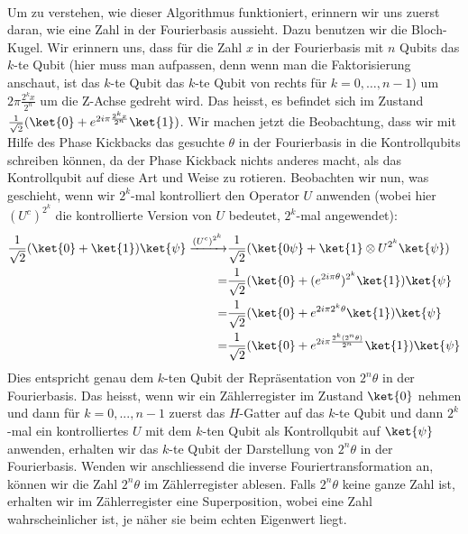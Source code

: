 \paragraph{}
\noindent Um zu verstehen, wie dieser Algorithmus funktioniert, erinnern wir uns zuerst daran, wie eine Zahl in der Fourierbasis aussieht. Dazu benutzen wir die Bloch-Kugel. Wir erinnern uns, dass für die Zahl $x$ in der Fourierbasis mit $n$ Qubits das $k$-te Qubit (hier muss man aufpassen, denn wenn man die Faktorisierung anschaut, ist das $k$-te Qubit das $k$-te Qubit von rechts für $k = 0, \dots, n - 1$) um $2\pi\frac{2^kx}{2^n}$ um die Z-Achse gedreht wird. Das heisst, es befindet sich im Zustand $\frac{1}{\sqrt{2}}(\ket{0} + e^{2i\pi\frac{2^kx}{2^n}}\ket{1})$. Wir machen jetzt die Beobachtung, dass wir mit Hilfe des Phase Kickbacks das gesuchte $\theta$ in der Fourierbasis in die Kontrollqubits schreiben können, da der Phase Kickback nichts anderes macht, als das Kontrollqubit auf diese Art und Weise zu rotieren. Beobachten wir nun, was geschieht, wenn wir $2^k$-mal kontrolliert den Operator $U$ anwenden (wobei hier $(U^c)^{2^k}$ die kontrollierte Version von $U$ bedeutet, $2^k$-mal angewendet):
\begin{align*}
\frac{1}{\sqrt{2}}(\ket{0} + \ket{1})\ket{\psi} \xrightarrow{(U^c)^{2^k}} &\frac{1}{\sqrt{2}}(\ket{0\psi} + \ket{1}\otimes U^{2^k}\ket{\psi}) \\ = &\frac{1}{\sqrt{2}}(\ket{0} + (e^{2i\pi\theta})^{2^k}\ket{1})\ket{\psi} \\
= &\frac{1}{\sqrt{2}}(\ket{0} + e^{2i\pi2^k\theta}\ket{1})\ket{\psi} \\
= &\frac{1}{\sqrt{2}}(\ket{0} + e^{2i\pi\frac{2^k(2^n\theta)}{2^n}}\ket{1})\ket{\psi}
\end{align*}
Dies entspricht genau dem $k$-ten Qubit der Repräsentation von $2^n\theta$ in der Fourierbasis. Das heisst, wenn wir ein Zählerregister im Zustand $\ket{0}$ nehmen und dann für $k = 0, ..., n - 1$ zuerst das $H$-Gatter auf das $k$-te Qubit und dann $2^k$-mal ein kontrolliertes $U$ mit dem $k$-ten Qubit als Kontrollqubit auf $\ket{\psi}$ anwenden, erhalten wir das $k$-te Qubit der Darstellung von $2^n\theta$ in der Fourierbasis. Wenden wir anschliessend die inverse Fouriertransformation an, können wir die Zahl $2^n\theta$ im Zählerregister ablesen. Falls $2^n\theta$ keine ganze Zahl ist, erhalten wir im Zählerregister eine Superposition, wobei eine Zahl wahrscheinlicher ist, je näher sie beim echten Eigenwert liegt.

\paragraph{}

